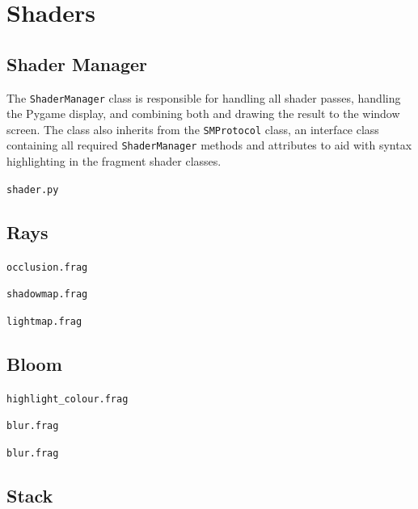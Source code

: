 \documentclass[../main/main.tex]{subfiles}
\begin{document}
\section{Shaders}
\subsection{Shader Manager}
The \lstinline{ShaderManager} class is responsible for handling all shader passes, handling the Pygame display, and combining both and drawing the result to the window screen. The class also inherits from the \lstinline{SMProtocol} class, an interface class containing all required \lstinline{ShaderManager} methods and attributes to aid with syntax highlighting in the fragment shader classes.

\noindent\verb|shader.py|


\subsection{Rays}
\noindent\verb|occlusion.frag|


\bigskip
\noindent\verb|shadowmap.frag|


\bigskip
\noindent\verb|lightmap.frag|


\subsection{Bloom}
\noindent\verb|highlight_colour.frag|


\noindent\verb|blur.frag|


\bigskip
\noindent\verb|blur.frag|


\subsection{Stack}
\end{document}
